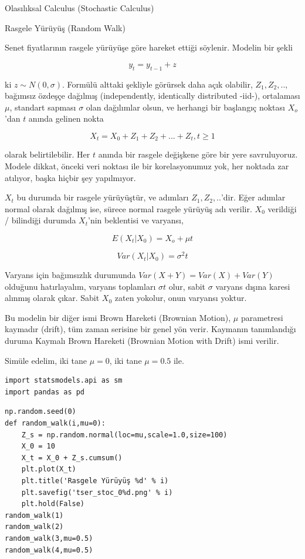 \documentclass[12pt,fleqn]{article}\usepackage{../../common}
\begin{document}
Olasılıksal Calculus (Stochastic Calculus)

Rasgele Yürüyüş (Random Walk)

Senet fiyatlarının rasgele yürüyüşe göre hareket ettiği söylenir. Modelin
bir şekli

$$ y_t = y_{t-1} + z $$

ki $z \sim N(0,\sigma)$. Formülü alttaki şekliyle görürsek daha açık olabilir,
$Z_1,Z_2,..,$ bağımsız özdeşçe dağılmış (independently, identically distributed
-iid-), ortalaması $\mu$, standart sapması $\sigma$ olan dağılımlar olsun, ve
herhangi bir başlangıç noktası $X_o$'dan $t$ anında gelinen nokta

$$ X_t = X_0 + Z_1 + Z_2 + ... + Z_t , t \ge 1$$

olarak belirtilebilir. Her $t$ anında bir rasgele değişkene göre bir yere
savruluyoruz. Modele dikkat, önceki veri noktası ile bir korelasyonumuz yok, her
noktada zar atılıyor, başka hiçbir şey yapılmıyor.

$X_t$ bu durumda bir rasgele yürüyüştür, ve adımları $Z_1,Z_2,..$'dir. Eğer
adımlar normal olarak dağılmış ise, sürece normal rasgele yürüyüş adı
verilir. $X_0$ verildiği / bilindiği durumda $X_t$'nin beklentisi ve varyansı,

$$ E(X_t|X_0) = X_o + \mu t $$

$$ Var(X_t|X_0) = \sigma^2 t $$

Varyans için bağımsızlık durumunda $Var(X+Y) = Var(X)+Var(Y)$ olduğunu
hatırlayalım, varyans toplamları $\sigma t$ olur, sabit $\sigma$ varyans dışına
karesi alınmış olarak çıkar. Sabit $X_0$ zaten yokolur, onun varyansı yoktur.

Bu modelin bir diğer ismi Brown Hareketi (Brownian Motion), $\mu$ parametresi
kaymadır (drift), tüm zaman serisine bir genel yön verir. Kaymanın tanımlandığı
duruma Kaymalı Brown Hareketi (Brownian Motion with Drift) ismi verilir.

Simüle edelim, iki tane $\mu=0$, iki tane $\mu=0.5$ ile. 

\begin{verbatim}
import statsmodels.api as sm
import pandas as pd
\end{verbatim}

\begin{verbatim}
np.random.seed(0)
def random_walk(i,mu=0):
    Z_s = np.random.normal(loc=mu,scale=1.0,size=100)
    X_0 = 10
    X_t = X_0 + Z_s.cumsum()
    plt.plot(X_t)
    plt.title('Rasgele Yürüyüş %d' % i)
    plt.savefig('tser_stoc_0%d.png' % i)
    plt.hold(False)
random_walk(1)
random_walk(2)
random_walk(3,mu=0.5)
random_walk(4,mu=0.5)
\end{verbatim}
\end{document}

